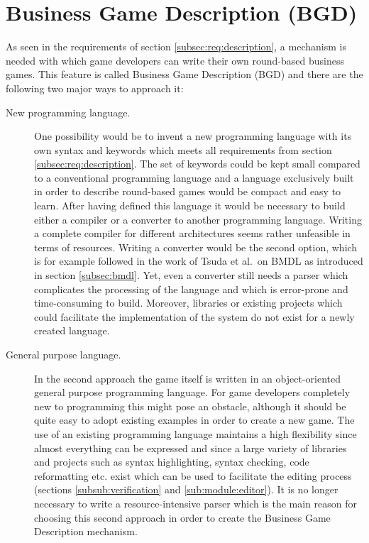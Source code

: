 \section{Business Game Description (BGD)}
\label{sec:bgd}

As seen in the requirements of section \ref{subsec:req:description}, a mechanism is needed with which game developers can write their own round-based business games. This feature is called Business Game Description (BGD) and there are the following two major ways to approach it:

\begin{description}
\item[New programming language.] One possibility would be to invent a new programming language with its own syntax and keywords which meets all requirements from section \ref{subsec:req:description}. The set of keywords could be kept small compared to a conventional programming language and a language exclusively built in order to describe round-based games would be compact and easy to learn. After having defined this language it would be necessary to build either a compiler or a converter to another programming language. Writing a complete compiler for different architectures seems rather unfeasible in terms of resources. Writing a converter would be the second option, which is for example followed in the work of Tsuda et al.~on BMDL \cite{bmdl1} as introduced in section \ref{subsec:bmdl}. Yet, even a converter still needs a parser which complicates the processing of the language \cite{japanisch} and which is error-prone and time-consuming to build. Moreover, libraries or existing projects which could facilitate the implementation of the system do not exist for a newly created language.
\item[General purpose language.] In the second approach the game itself is written in an object-oriented general purpose programming language. For game developers completely new to programming this might pose an obstacle, although it should be quite easy to adopt existing examples in order to create a new game. The use of an existing programming language maintains a high flexibility since almost everything can be expressed and since a large variety of libraries and projects such as syntax highlighting, syntax checking, code reformatting etc. exist which can be used to facilitate the editing process (sections \ref{subsub:verification} and \ref{sub:module:editor}). It is no longer necessary to write a resource-intensive parser which is the main reason for choosing this second approach in order to create the Business Game Description mechanism.
\end{description}

